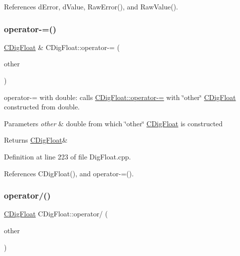 References d\+Error, d\+Value, Raw\+Error(), and Raw\+Value().

\mbox{\label{classCDigFloat_a783166f772c1d638b03eb62de27d775d}} 
\subsubsection{\texorpdfstring{operator-\/=()}{operator-=()}\hspace{0.1cm}{\footnotesize\ttfamily [2/2]}}
{\footnotesize\ttfamily \hyperlink{classCDigFloat}{C\+Dig\+Float} \& C\+Dig\+Float\+::operator-\/= (\begin{DoxyParamCaption}\item[{const double}]{other }\end{DoxyParamCaption})}



operator-\/= with double\+: calls \hyperlink{classCDigFloat_a7496a4f8445815e9a346076c3d90305a}{C\+Dig\+Float\+::operator-\/=} with \char`\"{}other\char`\"{} \hyperlink{classCDigFloat}{C\+Dig\+Float} constructed from double. 


\begin{DoxyParams}{Parameters}
{\em other} & double from which \char`\"{}other\char`\"{} \hyperlink{classCDigFloat}{C\+Dig\+Float} is constructed \\
\hline
\end{DoxyParams}
\begin{DoxyReturn}{Returns}
\hyperlink{classCDigFloat}{C\+Dig\+Float}\& 
\end{DoxyReturn}


Definition at line 223 of file Dig\+Float.\+cpp.



References C\+Dig\+Float(), and operator-\/=().

\mbox{\label{classCDigFloat_a238db4ab96c398e3d2387641743d6a16}} 
\subsubsection{\texorpdfstring{operator/()}{operator/()}\hspace{0.1cm}{\footnotesize\ttfamily [1/2]}}
{\footnotesize\ttfamily \hyperlink{classCDigFloat}{C\+Dig\+Float} C\+Dig\+Float\+::operator/ (\begin{DoxyParamCaption}\item[{const \hyperlink{classCDigFloat}{C\+Dig\+Float} \&}]{other }\end{DoxyParamCaption})}




